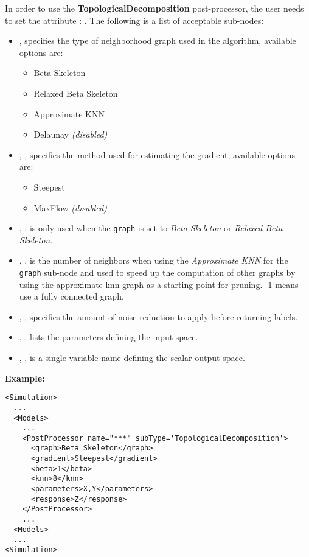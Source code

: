 In order to use the \textbf{TopologicalDecomposition} post-processor, the user
needs to set the attribute : 
. 
The following is a list of acceptable sub-nodes:
\begin{itemize}
  \item {} , specifies the type
  of neighborhood graph used in the algorithm, available options are:
  \begin{itemize}
    \item Beta Skeleton
    \item Relaxed Beta Skeleton
    \item Approximate KNN
    \item Delaunay \textit{(disabled)}
  \end{itemize}
  \item {}, , specifies the 
  method used for estimating the gradient, available options are:
  \begin{itemize}
    \item Steepest
    \item MaxFlow \textit{(disabled)}
  \end{itemize}
  \item {}, , is only used when the
  \texttt{graph} is set to \textit{Beta Skeleton} or \textit{Relaxed Beta
  Skeleton}.
  \item {}, , is the number of
  neighbors when using the \textit{Approximate KNN} for the \texttt{graph}
  sub-node and used to speed up the computation of other graphs by using the
  approximate knn graph as a starting point for pruning. -1 means use a fully
  connected graph.
  \item {}, , specifies the
  amount of noise reduction to apply before returning labels. 
  \item {}, ,
  lists the parameters defining the input space.
  \item {}, , is a single
  variable name defining the scalar output space.
\end{itemize}
\textbf{Example:}
\begin{lstlisting}[style=XML,morekeywords={subType}]
<Simulation>
  ...
  <Models>
    ...
    <PostProcessor name="***" subType='TopologicalDecomposition'>
      <graph>Beta Skeleton</graph>
      <gradient>Steepest</gradient>
      <beta>1</beta>
      <knn>8</knn>
      <parameters>X,Y</parameters>
      <response>Z</response>
    </PostProcessor>
    ...
  <Models>
  ...
<Simulation>
\end{lstlisting}
